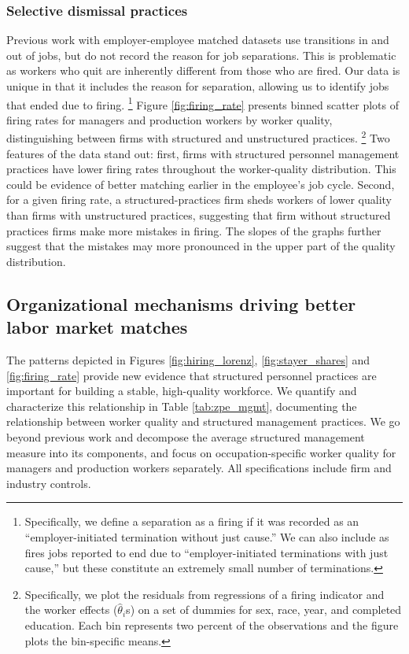 \subsubsection{Selective dismissal practices}

Previous work with employer-employee matched datasets use transitions in and out of jobs, but do not record the reason for job separations. This is problematic as workers who quit are inherently different from those who are fired. Our data is unique in that it includes the reason for separation, allowing us to identify jobs that ended due to firing.%
\footnote{Specifically, we define a separation as a firing if it was recorded as an ``employer-initiated termination without just cause.'' We can also include as fires jobs reported to end due to ``employer-initiated terminations with just cause,'' but these constitute an extremely small number of terminations.}
Figure \ref{fig:firing_rate} presents binned scatter plots of firing rates for managers and production workers by worker quality, distinguishing between firms with structured and unstructured practices.%
\footnote{Specifically, we plot the residuals from regressions of a firing indicator and the worker effects ($\hat\theta_i$s) on a set of dummies for sex, race, year, and completed education.  Each bin represents two percent of the observations and the figure plots the bin-specific means.}
Two features of the data stand out: first, firms with structured personnel management practices have lower firing rates throughout the worker-quality distribution. This could be evidence of better matching earlier in the employee's job cycle. Second, for a given firing rate, a structured-practices firm sheds workers of lower quality than firms with unstructured practices, suggesting that firm without structured practices firms make more mistakes in firing. The slopes of the graphs further suggest that the mistakes may more pronounced  in the upper part of the quality distribution.

\subsection{Organizational mechanisms driving better labor market matches} 
The patterns depicted in Figures \ref{fig:hiring_lorenz}, \ref{fig:stayer_shares} and \ref{fig:firing_rate} provide new evidence that structured personnel practices are important for building a stable, high-quality workforce. We quantify and characterize this relationship in Table \ref{tab:zpe_mgmt}, documenting the relationship between worker quality and structured management practices. We go beyond previous work and decompose the average structured management measure into its components, and focus on occupation-specific worker quality for managers and production workers separately. All specifications include firm and industry controls. 

